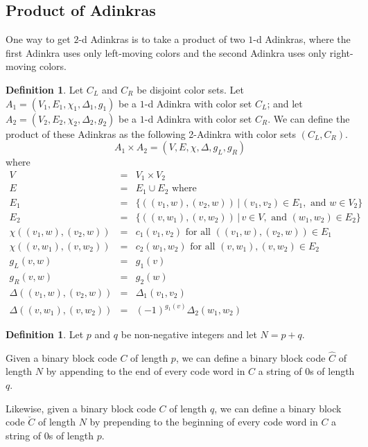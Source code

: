 \documentclass[12pt,twoside,singlespace]{article}
\numberwithin{equation}{section}
\theoremstyle{definition}
\newtheorem{definition}[equation]{Definition}
\begin{document}
\subsection{Product of Adinkras}
One way to get $2$-d Adinkras is to take a product of two $1$-d Adinkras, where the first Adinkra uses only left-moving colors and the second Adinkra uses only right-moving colors.

\begin{definition}
Let $C_L$ and $C_R$ be disjoint color sets.  Let $A_1=(V_1, E_1, \chi_1, \Delta_1,g_1)$ be a $1$-d Adinkra with color set $C_L$; and let $A_2=(V_2, E_2, \chi_2, \Delta_2,g_2)$ be a $1$-d Adinkra with color set $C_R$.  We can define the product of these Adinkras as the following 2-Adinkra with color sets $(C_L,C_R)$.
\[A_1\times A_2=(V,E,\chi,\Delta,g_L,g_R)\]
where
\begin{eqnarray*}
V&=&V_1\times V_2\\
E&=&E_1\cup E_2\mbox{ where}\\
E_1&=&\{((v_1,w),(v_2,w))\,|\,(v_1, v_2)\in E_1,\mbox{ and } w\in V_2\}\\
E_2&=&\{((v,w_1),(v,w_2))\,|\,v\in V, \mbox{ and }(w_1,w_2)\in E_2\}\\
\chi((v_1,w),(v_2,w))&=&c_1(v_1,v_2)\mbox{ for all $((v_1,w),(v_2,w))\in E_1$}\\
\chi((v,w_1),(v,w_2))&=&c_2(w_1,w_2)\mbox{ for all $(v,w_1),(v,w_2)\in E_2$}\\
g_L(v,w)&=&g_1(v)\\
g_R(v,w)&=&g_2(w)\\
\Delta((v_1,w),(v_2,w))&=&\Delta_1(v_1,v_2)\\
\Delta((v,w_1),(v,w_2))&=&(-1)^{g_1(v)}\Delta_2(w_1,w_2)
\end{eqnarray*}
\end{definition}

\begin{definition}
Let $p$ and $q$ be non-negative integers and let $N=p+q$.

Given a binary block code $C$ of length $p$, we can define a binary block code $\hat{C}$ of length $N$ by appending to the end of every code word in $C$ a string of $0$s of length $q$.

Likewise, given a binary block code $C$ of length $q$, we can define a binary block code $\check{C}$ of length $N$ by prepending to the beginning of every code word in $C$ a string of $0$s of length $p$.
\end{definition}
\end{document}
